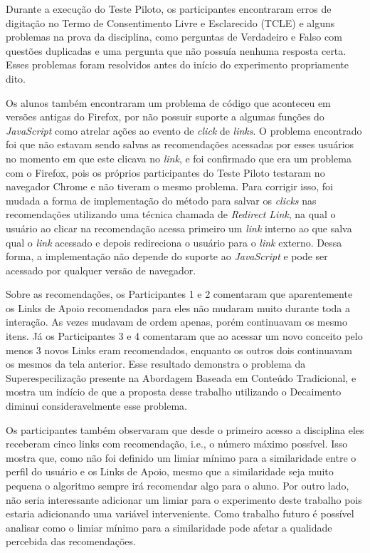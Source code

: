 Durante a execução do Teste Piloto, os participantes encontraram erros de digitação no Termo de Consentimento Livre e Esclarecido (TCLE)
e alguns problemas na prova da disciplina, como perguntas de Verdadeiro e Falso com questões duplicadas e uma
pergunta que não possuía nenhuma resposta certa. Esses problemas foram resolvidos antes do início do experimento
propriamente dito.

Os alunos também encontraram um problema de código que aconteceu em versões antigas do Firefox, por não possuir suporte a
algumas funções do \textit{JavaScript} como atrelar ações ao evento de \textit{click} de \textit{links}. O problema encontrado foi que não estavam
sendo salvas as recomendações acessadas por esses usuários no momento em que este clicava no \textit{link}, e foi confirmado
que era um problema com o Firefox, pois os próprios participantes do Teste Piloto testaram no navegador Chrome e não tiveram
o mesmo problema. Para corrigir isso, foi mudada a forma de implementação do método para salvar os \textit{clicks} nas recomendações
utilizando uma técnica chamada de \textit{Redirect Link}, na qual o usuário ao clicar na recomendação acessa primeiro um
\textit{link} interno ao \adaptweb que salva qual o \textit{link} acessado e depois redireciona o usuário para o \textit{link} externo.
Dessa forma, a implementação não depende do suporte ao \textit{JavaScript} e pode ser acessado por qualquer versão de navegador.

Sobre as recomendações, os Participantes 1 e 2 comentaram que aparentemente os Links de Apoio recomendados para eles não
mudaram muito durante toda a interação. As vezes mudavam de ordem apenas, porém continuavam os mesmo itens. Já os Participantes
3 e 4 comentaram que ao acessar um novo conceito pelo menos 3 novos Links eram recomendados, enquanto os outros dois continuavam
os mesmos da tela anterior. Esse resultado demonstra o problema da Superespecilização presente na Abordagem Baseada em Conteúdo Tradicional,
e mostra um indício de que a proposta desse trabalho utilizando o Decaimento diminui consideravelmente esse problema.

Os participantes também observaram que desde o primeiro acesso a disciplina eles receberam cinco links com recomendação, i.e.,
o número máximo possível. Isso mostra que, como não foi definido um limiar mínimo para a similaridade entre o perfil do usuário
e os Links de Apoio, mesmo que a similaridade seja muito pequena o algoritmo sempre irá recomendar algo para o aluno. Por
outro lado, não seria interessante adicionar um limiar para o experimento deste trabalho pois estaria adicionando uma
variável interveniente. Como trabalho futuro é possível analisar como o limiar mínimo para a similaridade pode afetar
a qualidade percebida das recomendações.


